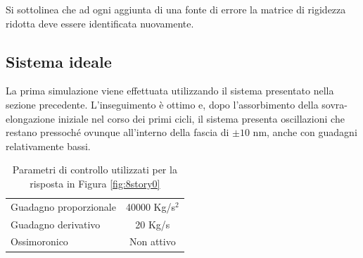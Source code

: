 Si sottolinea che ad ogni aggiunta di una fonte di errore la matrice di rigidezza ridotta deve essere identificata nuovamente. 

\subsection{Sistema ideale}

La prima simulazione viene effettuata utilizzando il sistema presentato nella sezione precedente. L'inseguimento è ottimo e, dopo l'assorbimento della sovra-elongazione iniziale nel corso dei primi cicli, il sistema presenta oscillazioni che restano pressoché ovunque all'interno della fascia di $\pm10$ nm, anche con guadagni relativamente bassi.

\begin{table}
\centering
\footnotesize
\begin{tabular}{lc}
\toprule
Guadagno proporzionale & 40000 Kg/s$^2$\\
Guadagno derivativo & 20 Kg/s\\
Ossimoronico & Non attivo\\
\bottomrule
\end{tabular}
\label{tab:8story0}
\caption{Parametri di controllo utilizzati per la risposta in Figura \ref{fig:8story0}}
\end{table}

